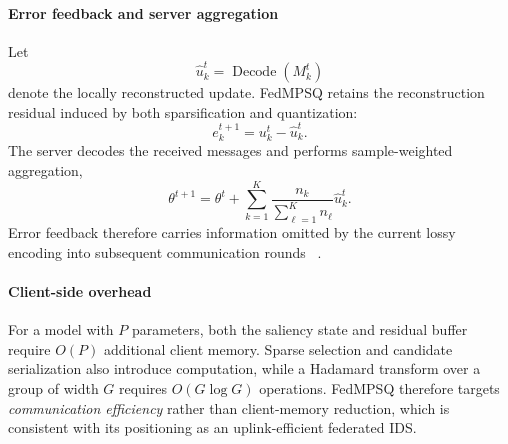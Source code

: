 \documentclass[conference,a4paper]{IEEEtran}
\begin{document}
\paragraph{Error feedback and server aggregation}
Let
\begin{equation}
\hat{u}_k^t
=
\operatorname{Decode}(M_k^t)
\end{equation}
denote the locally reconstructed update. FedMPSQ retains the reconstruction
residual induced by both sparsification and quantization:
\begin{equation}
e_k^{t+1}=u_k^t-\hat{u}_k^t.
\label{eq:feedback}
\end{equation}
The server decodes the received messages and performs sample-weighted
aggregation,
\begin{equation}
\theta^{t+1}
=
\theta^t+
\sum_{k=1}^{K}
\frac{n_k}{\sum_{\ell=1}^{K}n_\ell}
\hat{u}_k^t .
\label{eq:aggregation}
\end{equation}
Error feedback therefore carries information omitted by the current lossy
encoding into subsequent communication rounds
~\cite{karimireddy2019errorfeedback}.

\paragraph{Client-side overhead}
For a model with $P$ parameters, both the saliency state and residual buffer
require $O(P)$ additional client memory. Sparse selection and candidate
serialization also introduce computation, while a Hadamard transform over a
group of width $G$ requires $O(G\log G)$ operations. FedMPSQ therefore targets
\emph{communication efficiency} rather than client-memory reduction, which is
consistent with its positioning as an uplink-efficient federated IDS.

\end{document}
